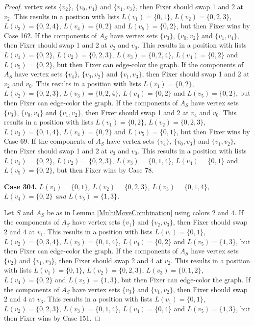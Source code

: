 \documentclass[12pt]{amsart}
\theoremstyle{plain}
\theoremstyle{definition}
\theoremstyle{remark}
\begin{document}
\begin{proof}
vertex sets $\{v_2\}$, $\{v_0, v_4\}$ and $\{v_1, v_3\}$, then Fixer should swap 1 and 2 at $v_2$. This results in a position with lists $L(v_1) = \{0, 1\}$, $L(v_2) = \{0, 2, 3\}$, $L(v_3) = \{0, 2, 4\}$, $L(v_4) = \{0, 2\}$ and $L(v_5) = \{0, 2\}$, but then Fixer wins by Case 162. If the components of $A_S$ have vertex sets $\{v_3\}$, $\{v_0, v_2\}$ and $\{v_1, v_4\}$, then Fixer should swap 1 and 2 at $v_2$ and $v_0$. This results in a position with lists $L(v_1) = \{0, 2\}$, $L(v_2) = \{0, 2, 3\}$, $L(v_3) = \{0, 2, 4\}$, $L(v_4) = \{0, 2\}$ and $L(v_5) = \{0, 2\}$, but then Fixer can edge-color the graph. If the components of $A_S$ have vertex sets $\{v_4\}$, $\{v_0, v_2\}$ and $\{v_1, v_3\}$, then Fixer should swap 1 and 2 at $v_2$ and $v_0$. This results in a position with lists $L(v_1) = \{0, 2\}$, $L(v_2) = \{0, 2, 3\}$, $L(v_3) = \{0, 2, 4\}$, $L(v_4) = \{0, 2\}$ and $L(v_5) = \{0, 2\}$, but then Fixer can edge-color the graph. If the components of $A_S$ have vertex sets $\{v_3\}$, $\{v_0, v_4\}$ and $\{v_1, v_2\}$, then Fixer should swap 1 and 2 at $v_4$ and $v_0$. This results in a position with lists $L(v_1) = \{0, 2\}$, $L(v_2) = \{0, 2, 3\}$, $L(v_3) = \{0, 1, 4\}$, $L(v_4) = \{0, 2\}$ and $L(v_5) = \{0, 1\}$, but then Fixer wins by Case 69. If the components of $A_S$ have vertex sets $\{v_4\}$, $\{v_0, v_3\}$ and $\{v_1, v_2\}$, then Fixer should swap 1 and 2 at $v_3$ and $v_0$. This results in a position with lists $L(v_1) = \{0, 2\}$, $L(v_2) = \{0, 2, 3\}$, $L(v_3) = \{0, 1, 4\}$, $L(v_4) = \{0, 1\}$ and $L(v_5) = \{0, 2\}$, but then Fixer wins by Case 78. 

\noindent\textbf{Case 304.  }\textit{$L(v_1) = \{0, 1\}$, $L(v_2) = \{0, 2, 3\}$, $L(v_3) = \{0, 1, 4\}$, $L(v_4) = \{0, 2\}$ and $L(v_5) = \{1, 3\}$.}

Let $S$ and $A_S$ be as in Lemma \ref{MultiMoveCombination} using colors $2$ and $4$. If the components of $A_S$ have vertex sets $\{v_1\}$ and $\{v_2, v_3\}$, then Fixer should swap 2 and 4 at $v_1$. This results in a position with lists $L(v_1) = \{0, 1\}$, $L(v_2) = \{0, 3, 4\}$, $L(v_3) = \{0, 1, 4\}$, $L(v_4) = \{0, 2\}$ and $L(v_5) = \{1, 3\}$, but then Fixer can edge-color the graph. If the components of $A_S$ have vertex sets $\{v_2\}$ and $\{v_1, v_3\}$, then Fixer should swap 2 and 4 at $v_2$. This results in a position with lists $L(v_1) = \{0, 1\}$, $L(v_2) = \{0, 2, 3\}$, $L(v_3) = \{0, 1, 2\}$, $L(v_4) = \{0, 2\}$ and $L(v_5) = \{1, 3\}$, but then Fixer can edge-color the graph. If the components of $A_S$ have vertex sets $\{v_3\}$ and $\{v_1, v_2\}$, then Fixer should swap 2 and 4 at $v_3$. This results in a position with lists $L(v_1) = \{0, 1\}$, $L(v_2) = \{0, 2, 3\}$, $L(v_3) = \{0, 1, 4\}$, $L(v_4) = \{0, 4\}$ and $L(v_5) = \{1, 3\}$, but then Fixer wins by Case 151. 


\end{proof}
\end{document}
